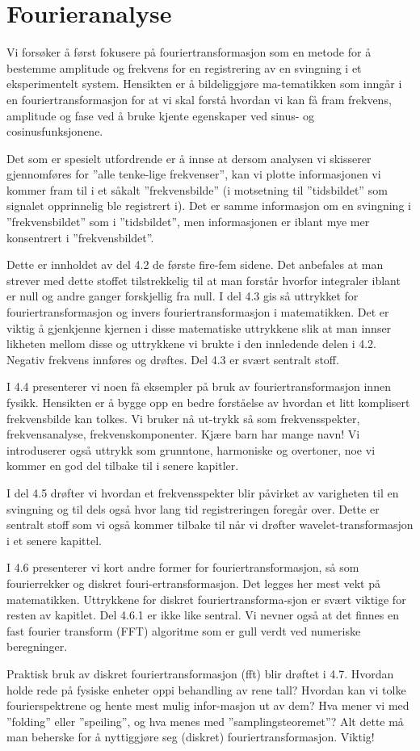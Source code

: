 \documentclass[12pt]{article}
\numberwithin{equation}{section}
\numberwithin{figure}{section}
\begin{document}
\section{Fourieranalyse}
Vi forsøker å først fokusere på fouriertransformasjon som en metode for å bestemme amplitude og frekvens for en registrering av en svingning i et eksperimentelt system. Hensikten er å bildeliggjøre ma-tematikken som inngår i en fouriertransformasjon for at vi skal forstå hvordan vi kan få fram frekvens, amplitude og fase ved å bruke kjente egenskaper ved sinus- og cosinusfunksjonene. 

Det som er spesielt utfordrende er å innse at dersom analysen vi skisserer gjennomføres for ”alle tenke-lige frekvenser”, kan vi plotte informasjonen vi kommer fram til i et såkalt ”frekvensbilde” (i motsetning til ”tidsbildet” som signalet opprinnelig ble registrert i). Det er samme informasjon om en svingning i ”frekvensbildet” som i ”tidsbildet”, men informasjonen er iblant mye mer konsentrert i ”frekvensbildet”. 

Dette er innholdet av del 4.2 de første fire-fem sidene. Det anbefales at man strever med dette stoffet tilstrekkelig til at man forstår hvorfor integraler iblant er null og andre ganger forskjellig fra null.
I del 4.3 gis så uttrykket for fouriertransformasjon og invers fouriertransformasjon i matematikken. Det er viktig å gjenkjenne kjernen i disse matematiske uttrykkene slik at man innser likheten mellom disse og uttrykkene vi brukte i den innledende delen i 4.2. Negativ frekvens innføres og drøftes. Del 4.3 er svært sentralt stoff.

I 4.4 presenterer vi noen få eksempler på bruk av fouriertransformasjon innen fysikk. Hensikten er å bygge opp en bedre forståelse av hvordan et litt komplisert frekvensbilde kan tolkes. Vi bruker nå ut-trykk så som frekvensspekter, frekvensanalyse, frekvenskomponenter. Kjære barn har mange navn! Vi introduserer også uttrykk som grunntone, harmoniske og overtoner, noe vi kommer en god del tilbake til i senere kapitler.

I del 4.5 drøfter vi hvordan et frekvensspekter blir påvirket av varigheten til en svingning og til dels også hvor lang tid registreringen foregår over. Dette er sentralt stoff som vi også kommer tilbake til når vi drøfter wavelet-transformasjon i et senere kapittel.

I 4.6 presenterer vi kort andre former for fouriertransformasjon, så som fourierrekker og diskret fouri-ertransformasjon. Det legges her mest vekt på matematikken. Uttrykkene for diskret fouriertransforma-sjon er svært viktige for resten av kapitlet. Del 4.6.1 er ikke like sentral. Vi nevner også at det finnes en fast fourier transform (FFT) algoritme som er gull verdt ved numeriske beregninger.

Praktisk bruk av diskret fouriertransformasjon (fft) blir drøftet i 4.7. Hvordan holde rede på fysiske enheter oppi behandling av rene tall? Hvordan kan vi tolke fourierspektrene og hente mest mulig infor-masjon ut av dem? Hva mener vi med ”folding” eller ”speiling”, og hva menes med ”samplingsteoremet”? Alt dette må man beherske for å nyttiggjøre seg (diskret) fouriertransformasjon. Viktig!
\end{document}
